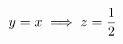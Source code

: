 \documentclass[preview]{standalone}
\begin{document}
\begin{align*}
\special{dvisvgm:raw <g id='unique000'>}y = x \implies z = \frac{1}{2}\special{dvisvgm:raw </g>}
\end{align*}
\end{document}
